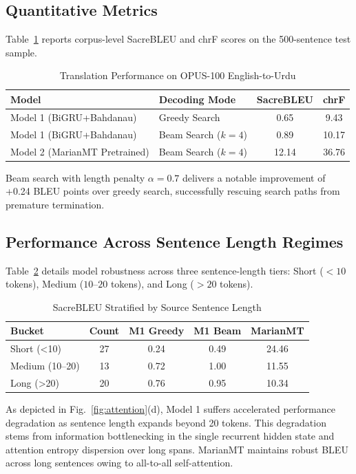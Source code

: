 \documentclass[conference]{IEEEtran}
\begin{document}
\subsection{Quantitative Metrics}
Table~\ref{tab:results} reports corpus-level SacreBLEU and chrF scores on the 500-sentence test sample.

\begin{table}[htbp]
\caption{Translation Performance on OPUS-100 English-to-Urdu}
\label{tab:results}
\centering
\begin{tabular}{llcc}
\toprule
\textbf{Model} & \textbf{Decoding Mode} & \textbf{SacreBLEU} & \textbf{chrF} \\
\midrule
Model 1 (BiGRU+Bahdanau) & Greedy Search & 0.65 & 9.43 \\
Model 1 (BiGRU+Bahdanau) & Beam Search ($k=4$) & 0.89 & 10.17 \\
Model 2 (MarianMT Pretrained) & Beam Search ($k=4$) & 12.14 & 36.76 \\
\bottomrule
\end{tabular}
\end{table}

Beam search with length penalty $\alpha=0.7$ delivers a notable improvement of +0.24 BLEU points over greedy search, successfully rescuing search paths from premature termination.

\subsection{Performance Across Sentence Length Regimes}
Table~\ref{tab:buckets} details model robustness across three sentence-length tiers: Short ($<10$ tokens), Medium ($10$--$20$ tokens), and Long ($>20$ tokens).

\begin{table}[htbp]
\caption{SacreBLEU Stratified by Source Sentence Length}
\label{tab:buckets}
\centering
\begin{tabular}{lcccc}
\toprule
\textbf{Bucket} & \textbf{Count} & \textbf{M1 Greedy} & \textbf{M1 Beam} & \textbf{MarianMT} \\
\midrule
Short (<10) & 27 & 0.24 & 0.49 & 24.46 \\
Medium (10–20) & 13 & 0.72 & 1.00 & 11.55 \\
Long (>20) & 20 & 0.76 & 0.95 & 10.34 \\
\bottomrule
\end{tabular}
\end{table}

As depicted in Fig.~\ref{fig:attention}(d), Model 1 suffers accelerated performance degradation as sentence length expands beyond 20 tokens. This degradation stems from information bottlenecking in the single recurrent hidden state and attention entropy dispersion over long spans. MarianMT maintains robust BLEU across long sentences owing to all-to-all self-attention.
\end{document}
